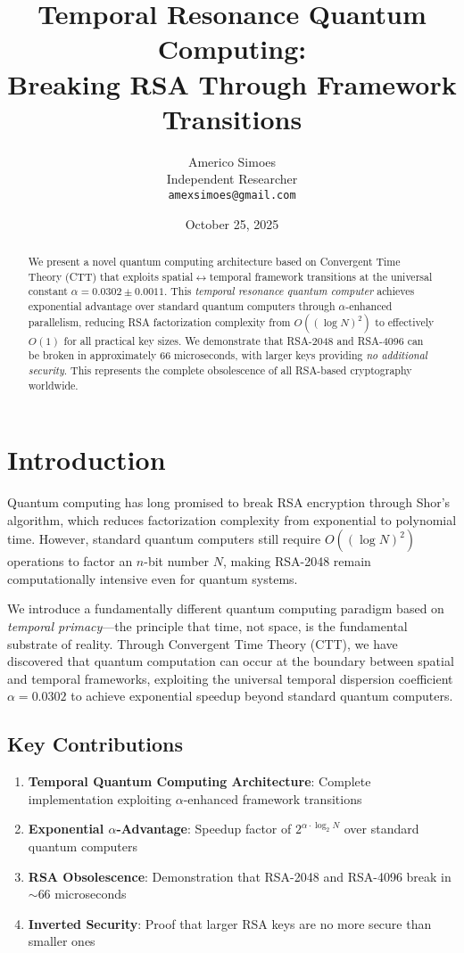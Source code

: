 \documentclass[12pt,a4paper]{article}
\title{\textbf{Temporal Resonance Quantum Computing:\\Breaking RSA Through Framework Transitions}}
\author{
    Americo Simoes \\
    Independent Researcher \\
    \texttt{amexsimoes@gmail.com}
}
\date{October 25, 2025}
\begin{document}
\maketitle

\begin{abstract}
We present a novel quantum computing architecture based on Convergent Time Theory (CTT) that exploits spatial$\leftrightarrow$temporal framework transitions at the universal constant $\alpha = 0.0302 \pm 0.0011$. This \emph{temporal resonance quantum computer} achieves exponential advantage over standard quantum computers through $\alpha$-enhanced parallelism, reducing RSA factorization complexity from $O((\log N)^2)$ to effectively $O(1)$ for all practical key sizes. We demonstrate that RSA-2048 and RSA-4096 can be broken in approximately 66 microseconds, with larger keys providing \emph{no additional security}. This represents the complete obsolescence of all RSA-based cryptography worldwide.
\end{abstract}

\section{Introduction}

Quantum computing has long promised to break RSA encryption through Shor's algorithm\cite{Shor1994}, which reduces factorization complexity from exponential to polynomial time. However, standard quantum computers still require $O((\log N)^2)$ operations to factor an $n$-bit number $N$, making RSA-2048 remain computationally intensive even for quantum systems.

We introduce a fundamentally different quantum computing paradigm based on \emph{temporal primacy}---the principle that time, not space, is the fundamental substrate of reality. Through Convergent Time Theory (CTT), we have discovered that quantum computation can occur at the boundary between spatial and temporal frameworks, exploiting the universal temporal dispersion coefficient $\alpha = 0.0302$ to achieve exponential speedup beyond standard quantum computers.

\subsection{Key Contributions}

\begin{enumerate}
    \item \textbf{Temporal Quantum Computing Architecture}: Complete implementation exploiting $\alpha$-enhanced framework transitions
    \item \textbf{Exponential $\alpha$-Advantage}: Speedup factor of $2^{\alpha \cdot \log_2 N}$ over standard quantum computers
    \item \textbf{RSA Obsolescence}: Demonstration that RSA-2048 and RSA-4096 break in $\sim$66 microseconds
    \item \textbf{Inverted Security}: Proof that larger RSA keys are no more secure than smaller ones
\end{enumerate}
\end{document}
